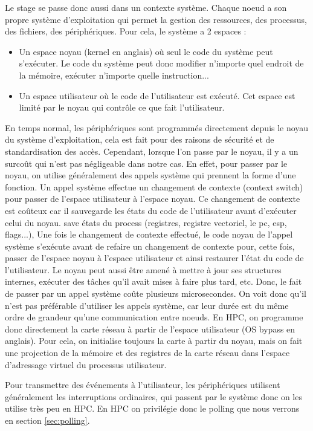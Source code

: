 Le stage se passe donc aussi dans un contexte système.
Chaque noeud a son propre système d'exploitation qui permet la gestion des ressources, des processus, des fichiers, des périphériques.
Pour cela, le système a 2 espaces :
\begin{itemize}
  \item Un espace noyau (kernel en anglais) où seul le code du système peut s'exécuter.
  Le code du système peut donc modifier n'importe quel endroit de la mémoire, exécuter n'importe quelle instruction...
  \item Un espace utilisateur où le code de l'utilisateur est exécuté.
  Cet espace est limité par le noyau qui contrôle ce que fait l'utilisateur.
\end{itemize}

En temps normal, les périphériques sont programmés directement depuis le noyau du système d'exploitation, cela est fait pour des raisons de sécurité et de standardisation des accès.
Cependant, lorsque l'on passe par le noyau, il y a un surcoût qui n'est pas négligeable dans notre cas.
En effet, pour passer par le noyau, on utilise généralement des appels système qui prennent la forme d'une fonction.
Un appel système effectue un changement de contexte (context switch) pour passer de l'espace utilisateur à l'espace noyau.
Ce changement de contexte est coûteux car il sauvegarde les états du code de l'utilisateur avant d'exécuter celui du noyau.
save états du process (registres, registre vectoriel, le pc, esp, flags...),
Une fois le changement de contexte effectué, le code noyau de l'appel système s'exécute avant de refaire un changement de contexte pour, cette fois, passer de l'espace noyau à l'espace utilisateur et ainsi restaurer l'état du code de l'utilisateur.
Le noyau peut aussi être amené à mettre à jour ses structures internes, exécuter des tâches qu'il avait mises à faire plus tard, etc.
Donc, le fait de passer par un appel système coûte plusieurs microsecondes.
On voit donc qu'il n'est pas préférable d'utiliser les appels système, car leur durée est du même ordre de grandeur qu'une communication entre noeuds.
En HPC, on programme donc directement la carte réseau à partir de l'espace utilisateur (OS bypass en anglais).
Pour cela, on initialise toujours la carte à partir du noyau, mais on fait une projection de la mémoire et des registres de la carte réseau dans l'espace d'adressage virtuel du processus utilisateur.

Pour transmettre des événements à l'utilisateur, les périphériques utilisent généralement les interruptions ordinaires, qui passent par le système donc on les utilise très peu en HPC.
En HPC on privilégie donc le polling que nous verrons en section \ref{sec:polling}.

